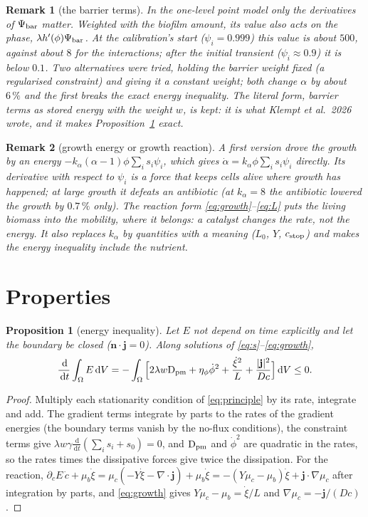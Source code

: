 \documentclass[11pt,a4paper]{article}
\newtheorem{proposition}{Proposition}
\newtheorem{remark}{Remark}
\newcommand{\dd}{\,\mathrm{d}}
\newcommand{\D}{\mathrm{D}}
\newcommand{\living}{\textstyle\sum_i s_i\psi_i}
\begin{document}
\begin{remark}[the barrier terms]\label{rem:barrier}
In the one-level point model only the derivatives of $\Psi_{\rm bar}$ matter. Weighted with
the biofilm amount, its value also acts on the phase, $\lambda h'(\phi)\Psi_{\rm bar}$. At the
calibration's start ($\psi_i=0.999$) this value is about $500$, against about $8$ for the
interactions; after the initial transient ($\psi_i\approx0.9$) it is below $0.1$. Two
alternatives were tried, holding the barrier weight fixed (a regularised constraint) and giving
it a constant weight; both change $\alpha$ by about $6\,\%$ and the first breaks the exact
energy inequality. The literal form, barrier terms as stored energy with the weight $w$, is
kept: it is what Klempt et al.\ 2026 wrote, and it makes Proposition~\ref{prop:energy} exact.
\end{remark}

\begin{remark}[growth energy or growth reaction]\label{rem:catalyst}
A first version drove the growth by an energy $-k_\alpha(\alpha-1)\phi\living$, which gives
$\dot\alpha=k_\alpha\phi\living$ directly. Its derivative with respect to $\psi_i$ is a force
that keeps cells alive where growth has happened; at large growth it defeats an antibiotic
(at $k_\alpha=8$ the antibiotic lowered the growth by $0.7\,\%$ only). The reaction form
\eqref{eq:growth}--\eqref{eq:L} puts the living biomass into the mobility, where it belongs:
a catalyst changes the rate, not the energy. It also replaces $k_\alpha$ by quantities with a
meaning ($L_0$, $Y$, $c_{\rm stop}$) and makes the energy inequality include the nutrient.
\end{remark}

\section{Properties}

\begin{proposition}[energy inequality]\label{prop:energy}
Let $E$ not depend on time explicitly and let the boundary be closed ($\mathbf n\cdot\mathbf
j=0$). Along solutions of \eqref{eq:s}--\eqref{eq:growth},
\[\frac{\dd}{\dd t}\int_\Omega E\dd V=-\int_\Omega\Big[2\lambda w\D_{\rm pm}+\eta_\phi\dot\phi^2
+\frac{\dot\xi^2}{L}+\frac{|\mathbf j|^2}{Dc}\Big]\dd V\le0 .\]
\end{proposition}
\begin{proof}
Multiply each stationarity condition of \eqref{eq:principle} by its rate, integrate and add.
The gradient terms integrate by parts to the rates of the gradient energies (the boundary terms
vanish by the no-flux conditions), the constraint terms give $\lambda w\gamma\frac{\dd}{\dd
t}(\sum_is_i+s_0)=0$, and $\D_{\rm pm}$ and $\dot\phi^2$ are quadratic in the rates, so the
rates times the dissipative forces give twice the dissipation. For the reaction,
$\partial_cE\,\dot c+\mu_b\dot\xi=\mu_c(-Y\dot\xi-\nabla\!\cdot\mathbf j)+\mu_b\dot\xi
=-(Y\mu_c-\mu_b)\dot\xi+\mathbf j\cdot\nabla\mu_c$ after integration by parts, and
\eqref{eq:growth} gives $Y\mu_c-\mu_b=\dot\xi/L$ and $\nabla\mu_c=-\mathbf j/(Dc)$.
\end{proof}
\end{document}
